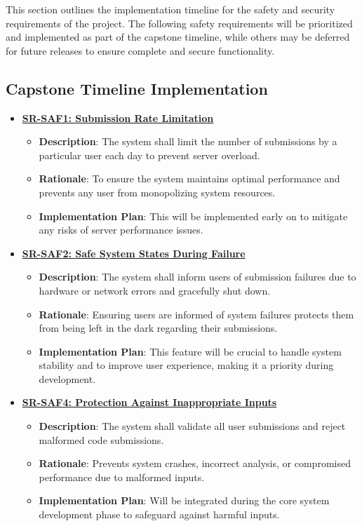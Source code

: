 \documentclass{article}
\begin{document}
This section outlines the implementation timeline for the safety and security requirements of the project. The following safety requirements will be prioritized and implemented as part of the capstone timeline, while others may be deferred for future releases to ensure complete and secure functionality.

\subsection{Capstone Timeline Implementation}

\begin{itemize}
    \item \textbf{\hyperref[req:saf1]{SR-SAF1: Submission Rate Limitation}}
    \begin{itemize}
        \item \textbf{Description}: The system shall limit the number of submissions by a particular user each day to prevent server overload.
        \item \textbf{Rationale}: To ensure the system maintains optimal performance and prevents any user from monopolizing system resources.
        \item \textbf{Implementation Plan}: This will be implemented early on to mitigate any risks of server performance issues.
    \end{itemize}

    \item \textbf{\hyperref[req:saf2]{SR-SAF2: Safe System States During Failure}}
    \begin{itemize}
        \item \textbf{Description}: The system shall inform users of submission failures due to hardware or network errors and gracefully shut down.
        \item \textbf{Rationale}: Ensuring users are informed of system failures protects them from being left in the dark regarding their submissions.
        \item \textbf{Implementation Plan}: This feature will be crucial to handle system stability and to improve user experience, making it a priority during development.
    \end{itemize}

    \item \textbf{\hyperref[req:saf4]{SR-SAF4: Protection Against Inappropriate Inputs}}
    \begin{itemize}
        \item \textbf{Description}: The system shall validate all user submissions and reject malformed code submissions.
        \item \textbf{Rationale}: Prevents system crashes, incorrect analysis, or compromised performance due to malformed inputs.
        \item \textbf{Implementation Plan}: Will be integrated during the core system development phase to safeguard against harmful inputs.
    \end{itemize}


\end{itemize}
\end{document}
